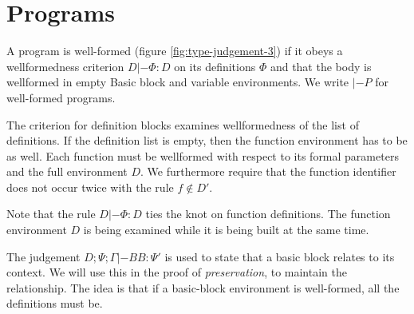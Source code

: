 \documentclass[a4paper, oneside, 10pt, draft]{memoir}
\begin{document}
\section{Programs}

A program is well-formed (figure \ref{fig:type-judgement-3}) if it
obeys a wellformedness criterion $\boxed{D |- \Phi : D}$ on its
definitions $\Phi$ and that the body is wellformed in empty Basic
block and variable environments. We write $\boxed{|- P}$ for
well-formed programs.

The criterion for definition blocks examines wellformedness of the
list of definitions. If the definition list is empty, then the
function environment has to be as well. Each function must be
wellformed with respect to its formal parameters and the full
environment $D$. We furthermore require that the function identifier
does not occur twice with the rule $f \not \in D'$.

Note that the rule $D |- \Phi : D$ ties the knot on function
definitions. The function environment $D$ is being examined while it
is being built at the same time.

The judgement $\boxed{D;\Psi;\Gamma |- BB : \Psi'}$ is used to state
that a basic block relates to its context. We will use this in the
proof of \emph{preservation}, to maintain the relationship. The idea
is that if a basic-block environment is well-formed, all the
definitions must be.
\end{document}
